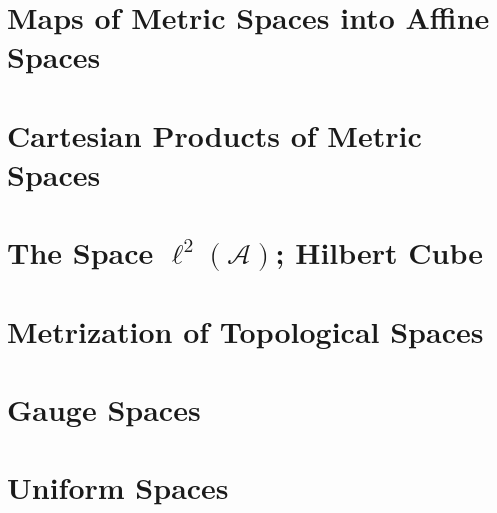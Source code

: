 \section{Maps of Metric Spaces into Affine Spaces}

\section{Cartesian Products of Metric Spaces}

\section{The Space \( \ell^{2}(\mathscr{A}) \); Hilbert Cube}

\section{Metrization of Topological Spaces}

\section{Gauge Spaces}

\section{Uniform Spaces}
